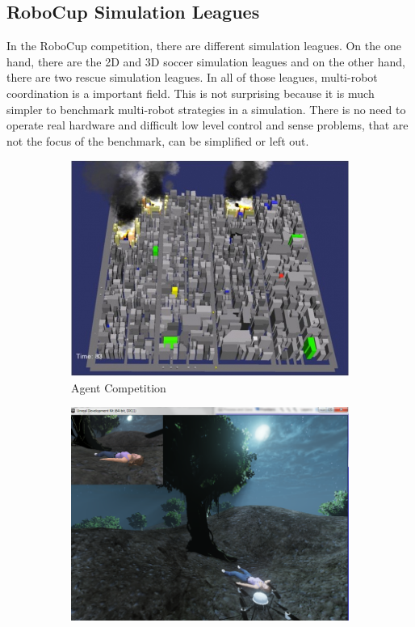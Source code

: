 \subsection{RoboCup Simulation Leagues}
In the RoboCup competition, there are different simulation leagues. On the one hand, there are the 2D and 3D soccer simulation leagues and on the other hand, there are two rescue simulation leagues. In all of those leagues, multi-robot coordination is a important field. This is not surprising because it is much simpler to benchmark multi-robot strategies in a simulation. There is no need to operate real hardware and difficult low level control and sense problems, that are not the focus of the benchmark, can be simplified or left out.\\
\begin{figure}
  \centering
  \begin{subfigure}[b]{0.48\textwidth}
    \includegraphics[width=\textwidth]{pics/rescue3d}
    \caption{Agent Competition~\cite{rescue3d}}
    \label{fig:rescue_agent_competition}
  \end{subfigure}
  \begin{subfigure}[b]{0.48\textwidth}
    \includegraphics[width=\textwidth]{pics/rescue_vrc}

\end{subfigure}
\end{figure}
